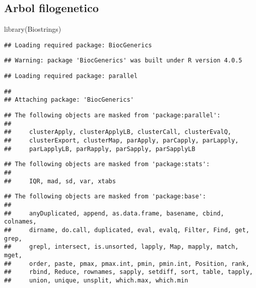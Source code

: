 \documentclass[
]{article}
\newenvironment{Shaded}{\begin{snugshade}}{\end{snugshade}}
\newcommand{\FunctionTok}[1]{\textcolor[rgb]{0.00,0.00,0.00}{#1}}
\newcommand{\NormalTok}[1]{#1}
\begin{document}
\hypertarget{arbol-filogenetico}{%
\subsection{Arbol filogenetico}\label{arbol-filogenetico}}

\begin{Shaded}
\begin{Highlighting}[]
\FunctionTok{library}\NormalTok{(Biostrings)}
\end{Highlighting}
\end{Shaded}

\begin{verbatim}
## Loading required package: BiocGenerics
\end{verbatim}

\begin{verbatim}
## Warning: package 'BiocGenerics' was built under R version 4.0.5
\end{verbatim}

\begin{verbatim}
## Loading required package: parallel
\end{verbatim}

\begin{verbatim}
## 
## Attaching package: 'BiocGenerics'
\end{verbatim}

\begin{verbatim}
## The following objects are masked from 'package:parallel':
## 
##     clusterApply, clusterApplyLB, clusterCall, clusterEvalQ,
##     clusterExport, clusterMap, parApply, parCapply, parLapply,
##     parLapplyLB, parRapply, parSapply, parSapplyLB
\end{verbatim}

\begin{verbatim}
## The following objects are masked from 'package:stats':
## 
##     IQR, mad, sd, var, xtabs
\end{verbatim}

\begin{verbatim}
## The following objects are masked from 'package:base':
## 
##     anyDuplicated, append, as.data.frame, basename, cbind, colnames,
##     dirname, do.call, duplicated, eval, evalq, Filter, Find, get, grep,
##     grepl, intersect, is.unsorted, lapply, Map, mapply, match, mget,
##     order, paste, pmax, pmax.int, pmin, pmin.int, Position, rank,
##     rbind, Reduce, rownames, sapply, setdiff, sort, table, tapply,
##     union, unique, unsplit, which.max, which.min
\end{verbatim}
\end{document}
